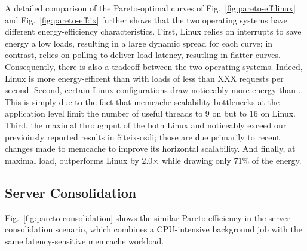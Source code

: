 A detailed comparison of the Pareto-optimal curves of
Fig.~\ref{fig:pareto-eff:linux} and Fig.~\ref{fig:pareto-eff:ix}
further shows that the two operating systems have different
energy-efficiency characteristics.  First, Linux relies on interrupts
to save energy a low loads, resulting in a large dynamic spread for
each curve; in contrast, \ix relies on polling to deliver load
latency, resutling in flatter curves.  Consequently, there is also a
tradeoff between the two operating systems.  Indeed, Linux is more
energy-efficent than \ix with loads of less than XXX requests per
second.  Second, certain Linux configurations draw noticeably more
energy than \ix.  This is simply due to the fact that memcache
scalability bottlenecks at the application level limit the number of
useful threads to 9 on \ix but to 16 on Linux.  Third, the maximal
throughput of the both Linux and \ix noticeably exceed our previoiusly
reported results in \~cite{ix-osdi}; those are due primarily to recent
changes made to memcache to improve its horizontal scalability.  And
finally, at maximal load, \ix outperforms Linux by 2.0$\times$ while
drawing only 71\% of the energy.


\subsection{Server Consolidation}

Fig.~\ref{fig:pareto-consolidation} shows the similar Pareto
efficiency in the server consolidation scenario, which combines a
CPU-intensive background job with the same latency-sensitive memcache
workload.

